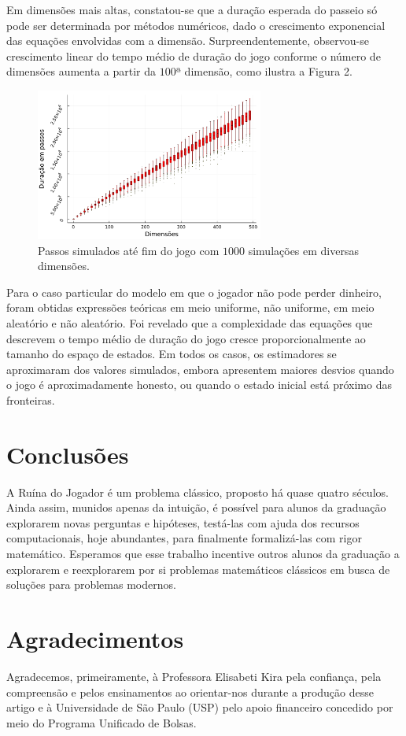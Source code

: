 \documentclass[a4paper,10pt,twocolumn]{article}
\begin{document}
Em dimensões mais altas, constatou-se que a duração esperada do passeio só pode
ser determinada por métodos numéricos, dado o crescimento exponencial das
equações envolvidas com a dimensão. Surpreendentemente, observou-se crescimento
linear do tempo médio de duração do jogo conforme o número de dimensões aumenta
a partir da $100$ª dimensão, como ilustra a Figura 2.

\begin{figure}[h]
    \centering
    \includegraphics[width=7.5cm]{"boxplots.pdf"}
    \centering
    \caption{Passos simulados até fim do jogo com $1000$ simulações em diversas
    dimensões.}
\end{figure}

Para o caso particular do modelo em que o jogador não pode perder dinheiro,
foram obtidas expressões teóricas em meio uniforme, não uniforme, em meio
aleatório e não aleatório. Foi revelado que a complexidade das equações que
descrevem o tempo médio de duração do jogo cresce proporcionalmente ao tamanho
do espaço de estados. Em todos os casos, os estimadores se aproximaram dos
valores simulados, embora apresentem maiores desvios quando o jogo é
aproximadamente honesto, ou quando o estado inicial está próximo das fronteiras.

\section{Conclusões}

A Ruína do Jogador é um problema clássico, proposto há quase quatro séculos.
Ainda assim, munidos apenas da intuição, é possível para alunos da graduação
explorarem novas perguntas e hipóteses, testá-las com ajuda dos recursos
computacionais, hoje abundantes, para finalmente formalizá-las com rigor
matemático. Esperamos que esse trabalho incentive outros alunos da graduação a
explorarem e reexplorarem por si problemas matemáticos clássicos em busca de
soluções para problemas modernos.

\section{Agradecimentos}

Agradecemos, primeiramente, à Professora Elisabeti Kira pela confiança, pela
compreensão e pelos ensinamentos ao orientar-nos durante a produção desse artigo
e à Universidade de São Paulo (USP) pelo apoio financeiro concedido por meio do
Programa Unificado de Bolsas.

\vspace{0.5cm}


\end{document}
